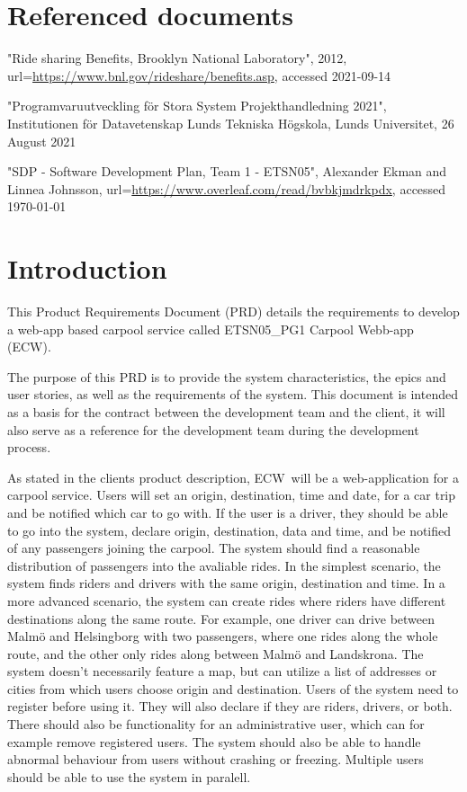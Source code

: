 \documentclass{article}
\newcommand{\name}{ECW\ }
\newcommand{\nameNospace}{ECW}
\begin{document}
\newpage

\section{Referenced documents}
\begin{thebibliography}{widest entry}
     "Ride sharing Benefits, Brooklyn National Laboratory", 2012, url=\url{https://www.bnl.gov/rideshare/benefits.asp}, accessed 2021-09-14
    
     "Programvaruutveckling för Stora System Projekthandledning 2021", Institutionen för Datavetenskap Lunds Tekniska Högskola, Lunds Universitet, 26 August 2021
    
     "SDP - Software Development Plan, Team 1 - ETSN05", Alexander Ekman and Linnea Johnsson, url=\url{https://www.overleaf.com/read/bvbkjmdrkpdx}, accessed \today
    
\end{thebibliography}

\section{Introduction}\label{sec:intro}
This Product Requirements Document (PRD) details the requirements to develop a web-app based carpool service called ETSN05\_PG1 Carpool Webb-app (\nameNospace).

The purpose of this PRD is to provide the system characteristics, the epics and user stories, as well as the requirements of the system. This document is intended as a basis for the contract between the development team and the client, it will also serve as a reference for the development team during the development process.

As stated in the clients product description\cite{PH}, \name will be a web-application for a carpool service. Users will set an origin, destination, time and date, for a car trip and be notified which car to go with. If the user is a driver, they should be able to go into the system, declare origin, destination, data and time, and be notified of any passengers joining the carpool. The system should find a reasonable distribution of passengers into the avaliable rides. In the simplest scenario, the system finds riders and drivers with the same origin, destination and time. In a more advanced scenario, the system can create rides where riders have different destinations along the same route. For example, one driver can drive between Malmö and Helsingborg with two passengers, where one rides along the whole route, and the other only rides along between Malmö and Landskrona. The system doesn't necessarily feature a map, but can utilize a list of addresses or cities from which users choose origin and destination. Users of the system need to register before using it. They will also declare if they are riders, drivers, or both. There should also be functionality for an administrative user, which can for example remove registered users. The system should also be able to handle abnormal behaviour from users without crashing or freezing. Multiple users should be able to use the system in paralell.
\end{document}
